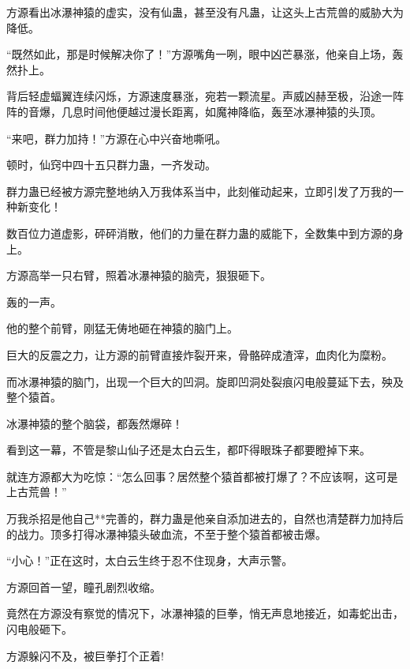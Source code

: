 \begin{this_body}
方源看出冰瀑神猿的虚实，没有仙蛊，甚至没有凡蛊，让这头上古荒兽的威胁大为降低。

“既然如此，那是时候解决你了！”方源嘴角一咧，眼中凶芒暴涨，他亲自上场，轰然扑上。

背后轻虚蝠翼连续闪烁，方源速度暴涨，宛若一颗流星。声威凶赫至极，沿途一阵阵的音爆，几息时间他便越过漫长距离，如魔神降临，轰至冰瀑神猿的头顶。

“来吧，群力加持！”方源在心中兴奋地嘶吼。

顿时，仙窍中四十五只群力蛊，一齐发动。

群力蛊已经被方源完整地纳入万我体系当中，此刻催动起来，立即引发了万我的一种新变化！

数百位力道虚影，砰砰消散，他们的力量在群力蛊的威能下，全数集中到方源的身上。

方源高举一只右臂，照着冰瀑神猿的脑壳，狠狠砸下。

轰的一声。

他的整个前臂，刚猛无俦地砸在神猿的脑门上。

巨大的反震之力，让方源的前臂直接炸裂开来，骨骼碎成渣滓，血肉化为糜粉。

而冰瀑神猿的脑门，出现一个巨大的凹洞。旋即凹洞处裂痕闪电般蔓延下去，殃及整个猿首。

冰瀑神猿的整个脑袋，都轰然爆碎！

看到这一幕，不管是黎山仙子还是太白云生，都吓得眼珠子都要瞪掉下来。

就连方源都大为吃惊：“怎么回事？居然整个猿首都被打爆了？不应该啊，这可是上古荒兽！”

万我杀招是他自己**完善的，群力蛊是他亲自添加进去的，自然也清楚群力加持后的战力。顶多打得冰瀑神猿头破血流，不至于整个猿首都被击爆。

“小心！”正在这时，太白云生终于忍不住现身，大声示警。

方源回首一望，瞳孔剧烈收缩。

竟然在方源没有察觉的情况下，冰瀑神猿的巨拳，悄无声息地接近，如毒蛇出击，闪电般砸下。

方源躲闪不及，被巨拳打个正着!

\end{this_body}

